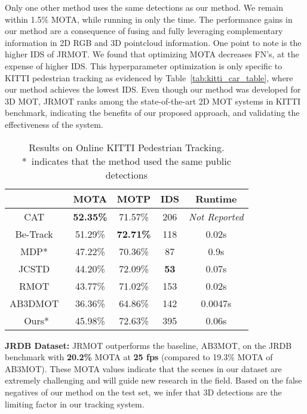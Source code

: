 \documentclass[letterpaper, 10 pt, conference]{ieeeconf}
\newcommand{\jrdb}{JRDB\xspace}
\newcommand{\methodname}{{JRMOT}\xspace}
\begin{document}
Only one other method uses the same detections as our method. We remain within 1.5\% MOTA, while running in only  the time.
The performance gains in our method are a consequence of fusing and fully leveraging complementary information in 2D RGB and 3D pointcloud information. 
One point to note is the higher IDS of \methodname. We found that optimizing MOTA decreases FN's, at the expense of higher IDS. This hyperparameter optimization is only specific to KITTI pedestrian tracking as evidenced by Table~\ref{tab:kitti_car_table}, where our method achieves the  lowest IDS.
Even though our method was developed for 3D MOT, \methodname ranks among the state-of-the-art 2D MOT systems in KITTI benchmark, indicating the benefits of our proposed approach, and validating the effectiveness of the system.
\begin{table}[th!]
\footnotesize
    \centering
\begin{tabular}{ | c | c | c | c | c |}
\hline
 & MOTA  & MOTP  & IDS  & Runtime \\ 
   \hline\hline
 CAT~\cite{nguyen2019ISPRS} & \bf 52.35\% & 71.57\% & 206 &  \textit{Not Reported}\\ \hline
 Be-Track~\cite{Dimitrievski2019sensors} & 51.29\% & \bf 72.71\% & 118 & 0.02s\\
 \hline
 MDP*~\cite{Xiang_2015_ICCV} & 47.22\% & 70.36\% & 87 & 0.9s \\ \hline
 JCSTD~\cite{8621602} & 44.20\% & 72.09\% & \bf 53 & 0.07s \\ \hline
RMOT~\cite{7045866} & 43.77\% & 71.02\% & 153 & 0.02s \\ \hline
 AB3DMOT~\cite{Weng2019_3dmot} & 36.36\% & 64.86\% & 142 & 0.0047s \\ 
 \hline\hline
 Ours* & 45.98\% & 72.63\% & 395 & 0.06s \\
\hline
\end{tabular}
    \caption{Results on Online KITTI Pedestrian Tracking. *~indicates that the method used the same public detections}
    \label{tab:kitti_ped_table}
    \vspace{-5pt}
\end{table}

\textbf{\jrdb Dataset:} 
\methodname outperforms the baseline, AB3MOT, on the \jrdb benchmark with \textbf{20.2\%} MOTA at \textbf{25 fps} (compared to 19.3\% MOTA of AB3MOT). These MOTA values indicate that the scenes in our dataset are extremely challenging and will guide new research in the field. Based on the  false negatives of our method on the test set, we infer that 3D detections are the limiting factor in our tracking system. 
\end{document}
